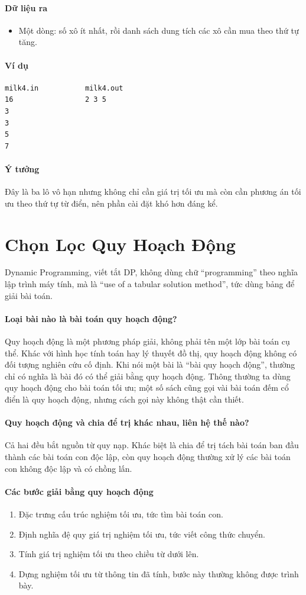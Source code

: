 \documentclass[11pt]{article}
\newcommand{\iosec}[1]{\paragraph{#1}}
\begin{document}
\iosec{Dữ liệu ra}
\begin{itemize}
  \item Một dòng: số xô ít nhất, rồi danh sách dung tích các xô cần mua theo thứ tự tăng.
\end{itemize}

\iosec{Ví dụ}
\begin{verbatim}
milk4.in           milk4.out
16                 2 3 5
3
3
5
7
\end{verbatim}

\iosec{Ý tưởng}
Đây là ba lô vô hạn nhưng không chỉ cần giá trị tối ưu mà còn cần phương án tối ưu theo thứ tự từ điển, nên phần cài đặt khó hơn đáng kể.

\section{Chọn Lọc Quy Hoạch Động}

Dynamic Programming, viết tắt DP, không dùng chữ ``programming'' theo nghĩa lập trình máy tính, mà là ``use of a tabular solution method'', tức dùng bảng để giải bài toán.

\paragraph{Loại bài nào là bài toán quy hoạch động?}
Quy hoạch động là một phương pháp giải, không phải tên một lớp bài toán cụ thể. Khác với hình học tính toán hay lý thuyết đồ thị, quy hoạch động không có đối tượng nghiên cứu cố định. Khi nói một bài là ``bài quy hoạch động'', thường chỉ có nghĩa là bài đó có thể giải bằng quy hoạch động. Thông thường ta dùng quy hoạch động cho bài toán tối ưu; một số sách cũng gọi vài bài toán đếm cổ điển là quy hoạch động, nhưng cách gọi này không thật cần thiết.

\paragraph{Quy hoạch động và chia để trị khác nhau, liên hệ thế nào?}
Cả hai đều bắt nguồn từ quy nạp. Khác biệt là chia để trị tách bài toán ban đầu thành các bài toán con độc lập, còn quy hoạch động thường xử lý các bài toán con không độc lập và có chồng lấn.

\paragraph{Các bước giải bằng quy hoạch động}
\begin{enumerate}
  \item Đặc trưng cấu trúc nghiệm tối ưu, tức tìm bài toán con.
  \item Định nghĩa đệ quy giá trị nghiệm tối ưu, tức viết công thức chuyển.
  \item Tính giá trị nghiệm tối ưu theo chiều từ dưới lên.
  \item Dựng nghiệm tối ưu từ thông tin đã tính, bước này thường không được trình bày.
\end{enumerate}
\end{document}
